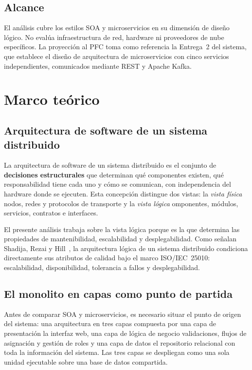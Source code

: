 \documentclass[12pt, a4paper]{article}
\begin{document}
\subsection{Alcance}

El análisis cubre los estilos SOA y microservicios en su dimensión de diseño
lógico. No evalúa infraestructura de red, hardware ni proveedores de nube
específicos. La proyección al PFC toma como referencia la Entrega~2 del sistema,
que establece el diseño de arquitectura de microservicios con cinco servicios
independientes, comunicados mediante REST y Apache Kafka.


\section{Marco teórico}
\label{sec:marco}


\subsection{Arquitectura de software de un sistema distribuido}

La arquitectura de software de un sistema distribuido es el conjunto de
\textbf{decisiones estructurales} que determinan qué componentes existen, qué
responsabilidad tiene cada uno y cómo se comunican, con independencia del hardware
donde se ejecuten. Esta concepción distingue dos vistas: la \textit{vista física}
nodos, redes y protocolos de transporte y la \textit{vista lógica} omponentes, módulos, servicios, contratos e interfaces.

El presente análisis trabaja sobre la vista lógica porque es la que determina las
propiedades de mantenibilidad, escalabilidad y desplegabilidad. Como señalan
Shadija, Rezai y Hill~\cite{shadija2017}, la arquitectura lógica de un sistema
distribuido condiciona directamente sus atributos de calidad bajo el marco
ISO/IEC~25010: escalabilidad, disponibilidad, tolerancia a fallos y desplegabilidad.

\subsection{El monolito en capas como punto de partida}

Antes de comparar SOA y microservicios, es necesario situar el punto de origen del
sistema: una arquitectura en tres capas compuesta por una capa de presentación
la interfaz web, una capa de lógica de negocio validaciones, flujos de
asignación y gestión de roles y una capa de datos el repositorio relacional
con toda la información del sistema. Las tres capas se despliegan como una sola
unidad ejecutable sobre una base de datos compartida.
\end{document}
